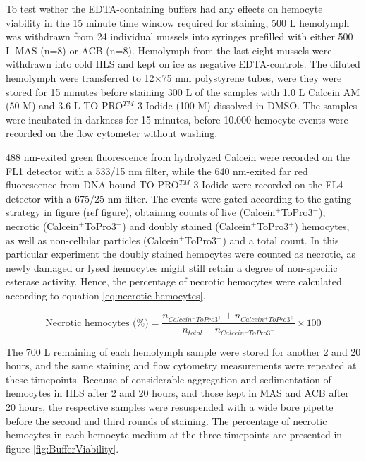 To test wether the EDTA-containing buffers had any effects on hemocyte viability in the 15 minute time window required for staining, 500 \micro L hemolymph was withdrawn from 24 individual mussels into syringes prefilled with either 500 \micro L MAS (n=8) or ACB (n=8). Hemolymph from the last eight mussels were withdrawn into cold HLS and kept on ice as negative EDTA-controls. The diluted hemolymph were transferred to 12$\times$75 mm polystyrene tubes, were they were stored for 15 minutes before staining 300 \micro L of the samples with 1.0 \micro L Calcein AM (50 \micro M) and 3.6 \micro L TO-PRO$^{TM}$-3 Iodide (100 \micro M) dissolved in DMSO. The samples were incubated in darkness for 15 minutes, before 10.000 hemocyte events were recorded on the flow cytometer without washing.

488 nm-exited green fluorescence from hydrolyzed Calcein were recorded on the FL1 detector with a 533/15 nm filter, while the 640 nm-exited far red fluorescence from DNA-bound TO-PRO$^{TM}$-3 Iodide were recorded on the FL4 detector with a 675/25 nm filter. The events were gated according to the gating strategy in figure (ref figure), obtaining counts of live (Calcein$^{+}$ToPro3$^{-}$), necrotic (Calcein$^{+}$ToPro3$^{-}$) and doubly stained (Calcein$^{+}$ToPro3$^{+}$) hemocytes, as well as non-cellular particles (Calcein$^{+}$ToPro3$^{-}$) and a total count. In this particular experiment the doubly stained hemocytes were counted as necrotic, as newly damaged or lysed hemocytes might still retain a degree of non-specific esterase activity. Hence, the percentage of necrotic hemocytes were calculated according to equation \ref{eq:necrotic hemocytes}.

\begin{equation}
    \label{eq:necrotic hemocytes}
    \text{Necrotic hemocytes (\%)} = \dfrac{n_{Calcein^{-}ToPro3^{+}} + n_{Calcein^{+}ToPro3^{+}}}{n_{total} - n_{Calcein^{-}ToPro3^{-}}} \times 100
\end{equation}

The 700 \micro L remaining of each hemolymph sample were stored for another 2 and 20 hours, and the same staining and flow cytometry measurements were repeated at these timepoints. Because of considerable aggregation and sedimentation of hemocytes in HLS after 2 and 20 hours, and those kept in MAS and ACB after 20 hours, the respective samples were resuspended with a wide bore pipette before the second and third rounds of staining. The percentage of necrotic hemocytes in each hemocyte medium at the three timepoints are presented in figure \ref{fig:BufferViability}.

